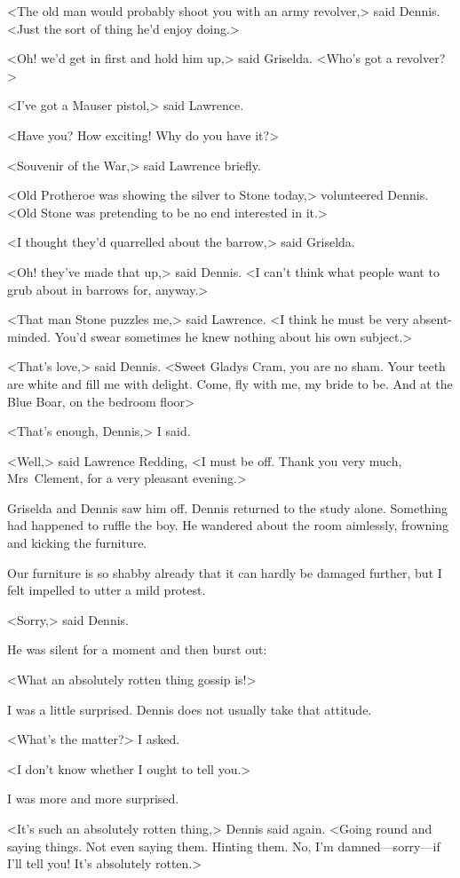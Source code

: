 <The old man would probably shoot you with an army revolver,> said Dennis. <Just the sort of thing he'd enjoy doing.>

<Oh! we'd get in first and hold him up,> said Griselda. <Who's got a revolver?>

<I've got a Mauser pistol,> said Lawrence.

<Have you? How exciting! Why do you have it?>

<Souvenir of the War,> said Lawrence briefly.

<Old Protheroe was showing the silver to Stone today,> volunteered Dennis. <Old Stone was pretending to be no end interested in it.>

<I thought they'd quarrelled about the barrow,> said Griselda.

<Oh! they've made that up,> said Dennis. <I can't think what people want to grub about in barrows for, anyway.>

<That man Stone puzzles me,> said Lawrence. <I think he must be very absent-minded. You'd swear sometimes he knew nothing about his own subject.>

<That's love,> said Dennis. <Sweet Gladys Cram, you are no sham. Your teeth are white and fill me with delight. Come, fly with me, my bride to be. And at the Blue Boar, on the bedroom floor\longdash>

<That's enough, Dennis,> I said.

<Well,> said Lawrence Redding, <I must be off. Thank you very much, Mrs~Clement, for a very pleasant evening.>

Griselda and Dennis saw him off. Dennis returned to the study alone. Something had happened to ruffle the boy. He wandered about the room aimlessly, frowning and kicking the furniture.

Our furniture is so shabby already that it can hardly be damaged further, but I felt impelled to utter a mild protest.

<Sorry,> said Dennis.

He was silent for a moment and then burst out:

<What an absolutely rotten thing gossip is!>

I was a little surprised. Dennis does not usually take that attitude.

<What's the matter?> I asked.

<I don't know whether I ought to tell you.>

I was more and more surprised.

<It's such an absolutely rotten thing,> Dennis said again. <Going round and saying things. Not even saying them. Hinting them. No, I'm damned—sorry—if I'll tell you! It's absolutely rotten.>

